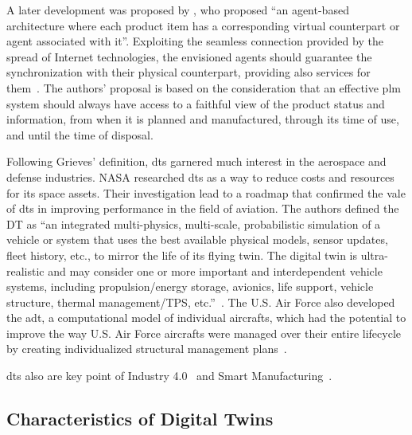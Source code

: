 A later development was proposed by \cite{framlingProductAgentsHandling2003}, who proposed ``an agent-based architecture where each product item has a corresponding virtual counterpart or agent associated with it''. Exploiting the seamless connection provided by the spread of Internet technologies, the envisioned agents should guarantee the synchronization with their physical counterpart, providing also services for them~\parencite{framlingProductAgentsHandling2003}. The authors' proposal is based on the consideration that an effective \acrshort{plm} system should always have access to a faithful view of the product status and information, from when it is planned and manufactured, through its time of use, and until the time of disposal.

Following Grieves' definition, \acrshort{dt}s garnered much interest in the aerospace and defense industries.
NASA researched \acrshort{dt}s as a way to reduce costs and resources for its space assets. Their investigation lead to a roadmap that confirmed the vale of \acrshort{dt}s in improving performance in the field of aviation. The authors defined the DT as ``an integrated multi-physics, multi-scale, probabilistic simulation of a vehicle or system that uses the best available physical models, sensor updates, fleet history, etc., to mirror the life of its flying twin. The digital twin is ultra-realistic and may consider one or more important and interdependent vehicle systems, including propulsion/energy storage, avionics, life support, vehicle structure, thermal management/TPS, etc.''~\parencite{shaftoModelingSimulationInformation2010}. The U.S. Air Force also developed the \acrfull{adt}, a computational model of individual aircrafts, which had the potential to improve the way U.S. Air Force aircrafts were managed over their entire lifecycle by creating individualized structural management plans~\parencite{tuegelAirframeDigitalTwin2012,gockelChallengesStructuralLife2012}.

\acrshort{dt}s also are key point of Industry 4.0~\parencite{brettelHowVirtualizationDecentralization2014,hermannDesignPrinciplesIndustrie2016,vachalekDigitalTwinIndustrial2017} and Smart Manufacturing~\parencite{mabkhotRequirementsSmartFactory2018}.

\subsection{Characteristics of Digital Twins}

